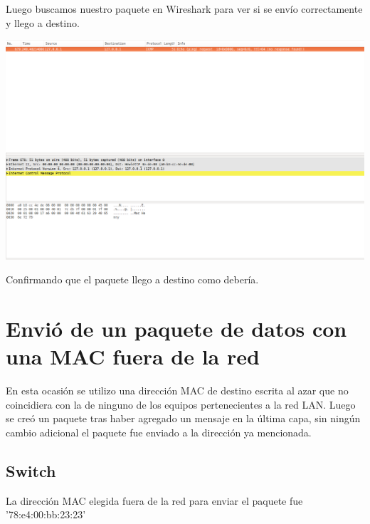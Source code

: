 \documentclass[spanish]{udpreport}
\begin{document}
Luego buscamos nuestro paquete en Wireshark para ver si se envío correctamente y llego a destino.\\

\begin{center}
	\includegraphics[scale=.27]{imagenes/Hub/ipmanti.png}
\end{center}

Confirmando que el paquete llego a destino como debería.

\pagebreak

\section{Envió de un paquete de datos con una MAC fuera de la red}

En esta ocasión se utilizo una dirección MAC de destino escrita al azar que no coincidiera con la de ninguno de los equipos pertenecientes a la red LAN. Luego se creó un paquete tras haber agregado un mensaje en la última capa, sin ningún cambio adicional el paquete fue enviado a la dirección ya mencionada.


\subsection{Switch}

La dirección MAC elegida fuera de la red para enviar el paquete fue '78:e4:00:bb:23:23'
\end{document}
